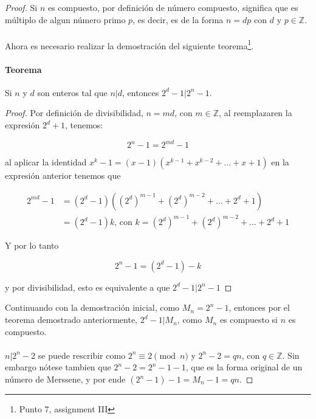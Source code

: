 \documentclass{article}
\begin{document}
	\begin{proof}
		Si $n$ es compuesto, por definición de número compuesto, significa que es múltiplo de algun número primo $p$, es decir, es de la forma $n = dp$ con $d$ y $p \in \mathbb{Z}$.
		
		\paragraph{} Ahora es necesario realizar la demostración del siguiente teorema\footnote{Punto 7, assignment III}.
		
		\paragraph{Teorema} Si $n$ y $d$ son enteros tal que $n|d$, entonces $2^d - 1 | 2^n - 1$.
		
		\begin{proof}
			Por definición de divisibilidad, $n = md$, con $m \in \mathbb{Z}$, al reemplazaren la expresión $2^{d} + 1$, tenemos:
			
			$$2^n -1 = 2^{md} - 1$$
			
			al aplicar la identidad $x^k - 1 = (x-1)(x^{k-1} + x^{k-2} + \dots + x + 1)$ en la expresión anterior tenemos que
			
			\begin{align*}
			2^{md} - 1 &= (2^d - 1) ((2^{d})^{m - 1} + (2^{d})^{m - 2} + \dots + 2^d + 1)\\
			&= (2^d - 1) k \text{, con } k = (2^d)^{m-1} + (2^d)^{m-2} + \dots + 2^d + 1
			\end{align*}
			
			Y por lo tanto 
			
			$$2^n - 1 = (2^d - 1) - k$$
			
			y  por divisibilidad, esto es equivalente a que $2^d - 1 | 2^n - 1$
		\end{proof}
		
		Continuando con la demostración inicial, como $M_n = 2^n -1$, entonces por el teorema demostrado anteriormente, $2^d - 1 | M_n$, como $M_n$ es compuesto si $n$ es compuesto.
		
		\paragraph{} $n|2^n - 2$ se puede rescribir como $2^n \equiv 2 \pmod{n}$ y $2^n - 2 = qn$, con $q \in \mathbb{Z}$. Sin embargo nótese tambien que $2^n - 2 = 2^n - 1 - 1$, que es la forma original de un número de Merssene, y por ende $(2^n - 1) - 1 = M_n - 1 = qn$.
		

\end{proof}
\end{document}
